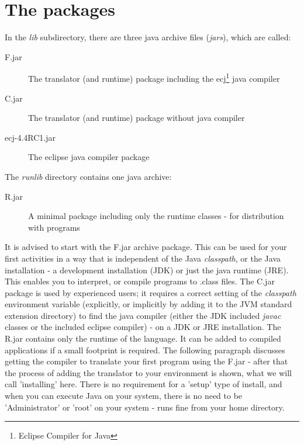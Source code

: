 \section{The \nr{} packages}
In the \emph{lib} subdirectory, there are three java archive files
(\emph{jars}), which are called:

\begin{description}
\item[\nr{}F.jar] The translator (and runtime) package including the
  ecj\footnote{Eclipse Compiler for Java} java compiler
\item[\nr{}C.jar] The translator (and runtime) package without java
  compiler
\item[ecj-4.4RC1.jar] The eclipse java compiler package
\end{description}

The \emph{runlib} directory contains one java archive:
\begin{description}
\item[\nr{}R.jar] A minimal package including only the runtime
  \nr{} classes - for distribution with \nr{} programs
\end{description}
It is advised to start with the \nr{}F.jar archive package. This can
be used for your first \nr{} activities in a way that is independent
of the Java \emph{classpath}, or the Java installation - a development
installation (JDK) or just the java runtime (JRE). This enables you to interpret, or
compile \nr{} programs to .class files. The \nr{}C.jar package is
used by experienced \nr{} users; it requires a correct setting of
the \emph{classpath} environment variable (explicitly, or implicitly
by adding it to the JVM standard extension directory) to find the java
compiler (either the JDK included \emph{javac} classes or the included
eclipse compiler) - on a JDK or JRE installation. The \nr{}R.jar
contains only the runtime of the \nr{} language. It can be added to
compiled \nr{} applications if a small footprint is required. The
following paragraph discusses getting the compiler to translate your
first program using the \nr{}F.jar - after that the process of
adding the translator to your environment is shown, what we will call
'installing' here. There is no requirement for a 'setup' type of
install, and when you can execute Java on your system, there is no
need to be 'Administrator' or 'root' on your system - \nr{} runs
fine from your home directory.

